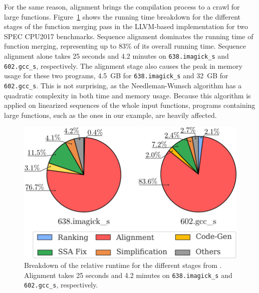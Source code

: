 \label{sec:motivation:breakdown}


For the same reason, alignment brings the compilation process to a crawl for large functions.
Figure~\ref{fig:compilation-breakdown-motivation-alignment} shows the running time breakdown for the different stages of the function merging pass in the LLVM-based \SOAName  implementation for two SPEC CPU2017 benchmarks. 
Sequence alignment dominates the running time of function merging, representing up to 83\% of its overall running time. 
Sequence alignment alone takes 25 seconds and 4.2 minutes on \texttt{638.imagick\_s} and \texttt{602.gcc\_s}, respectively.
The alignment stage also causes the peak in memory usage for these two programs, 4.5~GB for \texttt{638.imagick\_s} and 32~GB for \texttt{602.gcc\_s}.
This is not surprising, as the Needleman-Wunsch algorithm has a quadratic complexity in both time and memory usage.
Because this algorithm is applied on linearized sequences of the whole input functions, programs containing large functions, such as the ones in our example, are heavily affected.

\begin{figure}[h]
  \centering
  \includegraphics[width=0.7\linewidth]{src/lctes21/figs/compilation-breakdown-motivation-alignment.pdf}
  \caption{Breakdown of the relative runtime for the different stages from {\SOAName}. Alignment takes 25 seconds and 4.2 minutes on \texttt{638.imagick\_s} and \texttt{602.gcc\_s}, respectively.}
  \label{fig:compilation-breakdown-motivation-alignment}
\end{figure}

